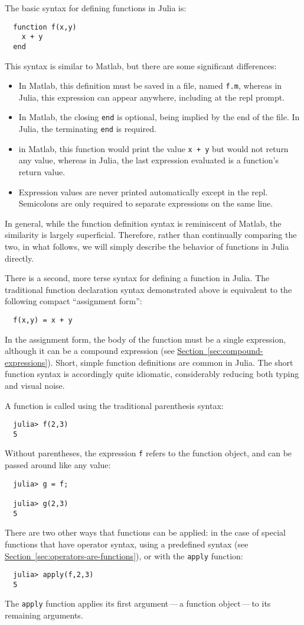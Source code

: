 \documentclass{article}
\newcommand{\Section}[1]{\hyperref[sec:#1]{Section~\ref*{sec:#1}}}
\begin{document}
The basic syntax for defining functions in Julia is:
\begin{verbatim}
  function f(x,y)
    x + y
  end
\end{verbatim}
This syntax is similar to Matlab, but there are some significant differences:
\begin{itemize}
\item In Matlab, this definition must be saved in a file, named \verb|f.m|, whereas in Julia, this expression can appear anywhere, including at the repl prompt.
\item In Matlab, the closing \verb|end| is optional, being implied by the end of the file.
In Julia, the terminating \verb|end| is required.
\item in Matlab, this function would print the value \verb|x + y| but would not return any value, whereas in Julia, the last expression evaluated is a function's return value.
\item Expression values are never printed automatically except in the repl.
Semicolons are only required to separate expressions on the same line.
\end{itemize}
In general, while the function definition syntax is reminiscent of Matlab, the similarity is largely superficial.
Therefore, rather than continually comparing the two, in what follows, we will simply describe the behavior of functions in Julia directly.

There is a second, more terse syntax for defining a function in Julia.
The traditional function declaration syntax demonstrated above is equivalent to the following compact ``assignment form'':
\begin{verbatim}
  f(x,y) = x + y
\end{verbatim}
In the assignment form, the body of the function must be a single expression, although it can be a compound expression (see \Section{compound-expressions}).
Short, simple function definitions are common in Julia.
The short function syntax is accordingly quite idiomatic, considerably reducing both typing and visual noise.

A function is called using the traditional parenthesis syntax:
\begin{verbatim}
  julia> f(2,3)
  5
\end{verbatim}
Without parentheses, the expression \verb|f| refers to the function object, and can be passed around like any value:
\begin{verbatim}
  julia> g = f;

  julia> g(2,3)
  5
\end{verbatim}
There are two other ways that functions can be applied:
in the case of special functions that have operator syntax, using a predefined syntax (see \Section{operators-are-functions}), or with the \verb|apply| function:
\begin{verbatim}
  julia> apply(f,2,3)
  5
\end{verbatim}
The \verb|apply| function applies its first argument\,---\,a function object\,---\,to its remaining arguments.
\end{document}
